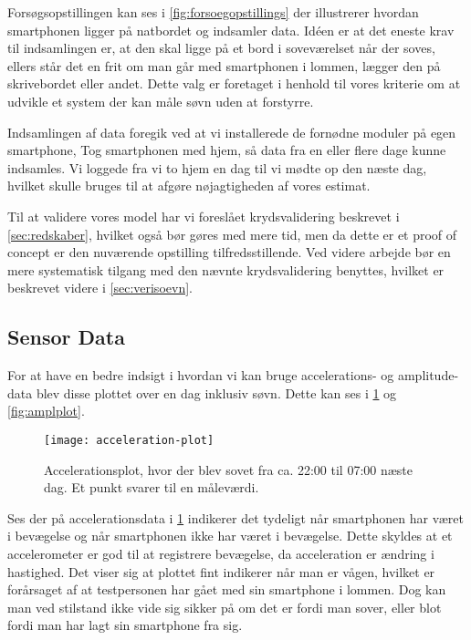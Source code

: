 Forsøgsopstillingen kan ses i \cref{fig:forsoegopstillings} der illustrerer hvordan smartphonen ligger på natbordet og indsamler data.
Idéen er at det eneste krav til indsamlingen er, at den skal ligge på et bord i soveværelset når der soves, ellers står det en frit om man går med smartphonen i lommen, lægger den på skrivebordet eller andet. 
Dette valg er foretaget i henhold til vores kriterie om at udvikle et system der kan måle søvn uden at forstyrre.

Indsamlingen af data foregik ved at vi installerede de fornødne moduler på egen smartphone, Tog smartphonen med hjem, så data fra en eller flere dage kunne indsamles.
Vi loggede fra vi to hjem en dag til vi mødte op den næste dag, hvilket skulle bruges til at afgøre nøjagtigheden af vores estimat.

Til at validere vores model har vi foreslået krydsvalidering beskrevet i \cref{sec:redskaber}, hvilket også bør gøres med mere tid, men da dette er et proof of concept er den nuværende opstilling tilfredsstillende.
Ved videre arbejde bør en mere systematisk tilgang med den nævnte krydsvalidering benyttes, hvilket er beskrevet videre i \cref{sec:verisoevn}.

\subsection{Sensor Data}
For at have en bedre indsigt i hvordan vi kan bruge accelerations- og amplitude-data blev disse plottet over en dag inklusiv søvn.
Dette kan ses i \cref{fig:accplot} og \cref{fig:amplplot}.

\begin{figure}[h]
	\centering
	\texttt{[image: acceleration-plot]}
	\caption{Accelerationsplot, hvor der blev sovet fra ca. 22:00 til 07:00 næste dag.  Et punkt svarer til en måleværdi.}\label{fig:accplot}
\end{figure}

Ses der på accelerationsdata i \cref{fig:accplot} indikerer det tydeligt når smartphonen har været i bevægelse og når smartphonen ikke har været i bevægelse.
Dette skyldes at et accelerometer er god til at registrere bevægelse, da acceleration er ændring i hastighed.
Det viser sig at plottet fint indikerer når man er vågen, hvilket er forårsaget af at testpersonen har gået med sin smartphone i lommen.
Dog kan man ved stilstand ikke vide sig sikker på om det er fordi man sover, eller blot fordi man har lagt sin smartphone fra sig.

